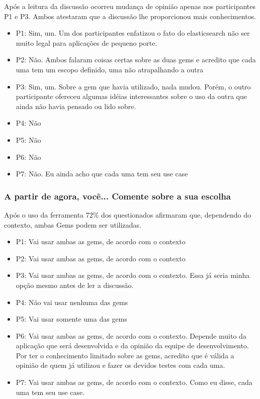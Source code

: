 Após a leitura da discussão ocorreu mudança de opinião apenas nos participantes P1 e P3. Ambos atestaram que a discussão lhe proporcionou mais conhecimentos.

\begin{itemize}
  \item P1: Sim, um. Um dos participantes enfatizou o fato do elasticsearch não ser muito legal para aplicações de pequeno porte.
  \item P2: Não. Ambos falaram coisas certas sobre as duas gems e acredito que cada uma tem um escopo definido, uma não atrapalhando a outra
  \item P3: Sim, um. Sobre a gem que havia utilizado, nada mudou. Porém, o outro participante ofereceu algumas idéias interessantes sobre o uso da outra que ainda não havia pensado ou lido sobre.
  \item P4: Não
  \item P5: Não
  \item P6: Não
  \item P7: Não. Eu ainda acho que cada uma tem seu use case
\end{itemize}

\subsubsection{A partir de agora, você... Comente sobre a sua escolha}

Após o uso da ferramenta 72\% dos questionados afirmaram que, dependendo do contexto, ambas Gems podem ser utilizadas.

\begin{itemize}
  \item P1: Vai usar ambas as gems, de acordo com o contexto
  \item P2: Vai usar ambas as gems, de acordo com o contexto
  \item P3: Vai usar ambas as gems, de acordo com o contexto. Essa já seria minha opção mesmo antes de ler a discussão.
  \item P4: Não vai usar nenhuma das gems
  \item P5: Vai usar somente uma das gems
  \item P6: Vai usar ambas as gems, de acordo com o contexto. Depende muito da aplicação que será desenvolvida e da opinião da equipe de desenvolvimento. Por ter o conhecimento limitado sobre as gems, acredito que é válida a opinião de quem já utilizou e fazer os devidos testes com cada uma.
  \item P7: Vai usar ambas as gems, de acordo com o contexto. Como eu disse, cada uma tem seu use case.
\end{itemize}

